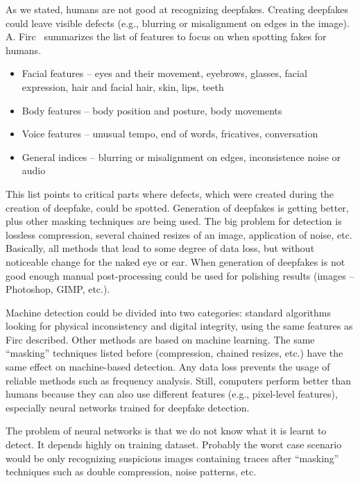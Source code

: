 As we stated, humans are not good at recognizing deepfakes. Creating deepfakes could leave visible defects (e.g., blurring or misalignment on edges in the image). A. Firc~\cite{ApplicabilityOfDeepfakes} summarizes the list of features to focus on when spotting fakes for humans.

\begin{itemize}
\item Facial features – eyes and their movement, eyebrows, glasses, facial expression, hair and facial hair, skin, lips, teeth
\item Body features – body position and posture, body movements
\item Voice features – unusual tempo, end of words, fricatives, conversation
\item General indices – blurring or misalignment on edges, inconsistence noise or audio
\end{itemize}
	
This list points to critical parts where defects, which were created during the creation of deepfake, could be spotted. Generation of deepfakes is getting better, plus other masking techniques are being used. The big problem for detection is lossless compression, several chained resizes of an image, application of noise, etc. Basically, all methods that lead to some degree of data loss, but without noticeable change for the naked eye or ear. When generation of deepfakes is not good enough manual post-processing could be used for polishing results (images – Photoshop, GIMP, etc.). 

Machine detection could be divided into two categories: standard algorithms looking for physical inconsistency and digital integrity, using the same features as Firc described. Other methods are based on machine learning. The same “masking” techniques listed before (compression, chained resizes, etc.) have the same effect on machine-based detection. Any data loss prevents the usage of reliable methods such as frequency analysis. Still, computers perform better than humans because they can also use different features (e.g., pixel-level features), especially neural networks trained for deepfake detection.~\cite{MediaForensicsandDeepFakes}

The problem of neural networks is that we do not know what it is learnt to detect. It depends highly on training dataset. Probably the worst case scenario would be only recognizing suspicious images containing traces after “masking” techniques such as double compression, noise patterns, etc.

